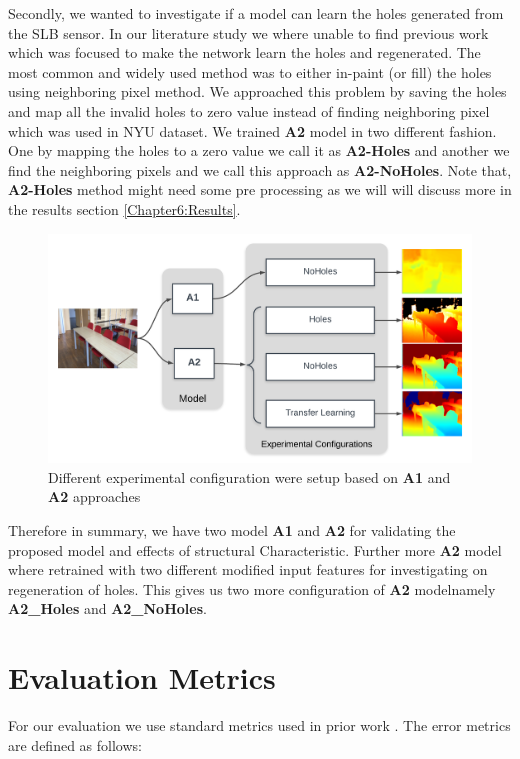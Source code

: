 Secondly, we wanted to investigate if a model can learn the holes generated from the SLB sensor. In our literature study we where unable to find previous work which was focused to make the network learn the holes and regenerated. The most common and widely used method was to either in-paint (or fill) the holes using neighboring pixel \cite{silberman11indoor} method. We approached this problem by saving the holes and map all the invalid holes to zero value instead of finding neighboring pixel which was used in NYU dataset. We trained \textbf{A2} model in two different fashion. One by mapping the holes to a zero value we call it as \textbf{A2-Holes} and another we find the neighboring pixels and we call this approach as \textbf{A2-NoHoles}. Note that, \textbf{A2-Holes} method might need some pre processing as we will will discuss more in the results section \ref{Chapter6:Results}.



\begin{figure}[h]
    \centering
    \includegraphics[width = 15cm]{Figures/config_setup.png}
    \caption{Different experimental configuration were setup based on \textbf{A1} and \textbf{A2} approaches}
    \label{fig:Experimental_Setup}
\end{figure}{}



Therefore in summary, we have two model \textbf{A1} and \textbf{A2} for validating the proposed model and effects of structural Characteristic. Further more \textbf{A2} model where retrained with two different modified input features for investigating on regeneration of holes. This gives us two more configuration of \textbf{A2} modelnamely \textbf{A2\_Holes} and \textbf{A2\_NoHoles}. 

\section{Evaluation Metrics}
For our evaluation we use standard metrics used in prior work \cite{Alhashim2018, eigen2014depth}. The error metrics are defined as follows:

